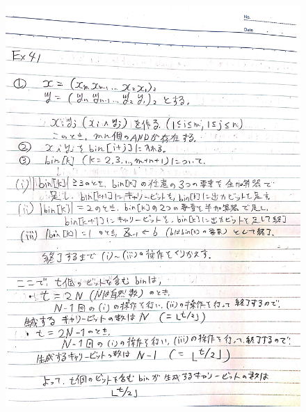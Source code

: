 \documentclass[dvipdfmx,a4paper,12pt]{jsarticle}
\begin{document}
\begin{figure}[htbp]
  \centering
  \includegraphics[width=130mm]{images/IMG_7422.JPG}
\end{figure}
\end{document}
